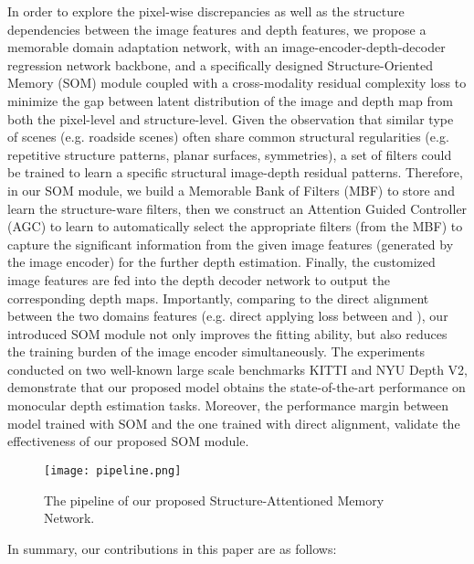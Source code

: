 \documentclass[letterpaper]{article} \usepackage{aaai20}  \usepackage{times}  \usepackage{helvet} \usepackage{courier}  \usepackage{graphicx} \frenchspacing  \setlength{\pdfpagewidth}{8.5in}  \setlength{\pdfpageheight}{11in}  \usepackage{epsfig}
\begin{document}
        \indent In order to explore the pixel-wise discrepancies as well as the structure dependencies between the image features and depth features, we propose a memorable domain adaptation network, with an image-encoder-depth-decoder regression network backbone, and a specifically designed Structure-Oriented Memory (SOM) module coupled with a cross-modality residual complexity loss to minimize the gap between latent distribution of the image and depth map from both the pixel-level and structure-level. Given the observation that similar type of scenes (e.g. roadside scenes) often share common structural regularities (e.g. repetitive structure patterns, planar surfaces, symmetries), a set of filters could be trained to learn a specific structural image-depth residual patterns. Therefore, in our SOM module, we build a Memorable Bank of Filters (MBF) to store and learn the structure-ware filters, then we construct an Attention Guided Controller (AGC) to learn to automatically select the appropriate filters (from the MBF) to capture the significant information from the given image features (generated by the image encoder) for the further depth estimation. Finally, the customized image features are fed into the depth decoder network to output the corresponding depth maps. Importantly, comparing to the direct alignment between the two domains features (e.g. direct applying  loss between  and ), our introduced SOM module not only improves the fitting ability, but also reduces the training burden of the image encoder simultaneously. The experiments conducted on two well-known large scale benchmarks KITTI and NYU Depth V2, demonstrate that our proposed model obtains the state-of-the-art performance on monocular depth estimation tasks. Moreover, the performance margin between model trained with SOM and the one trained with direct alignment, validate the effectiveness of our proposed SOM module.
        \begin{figure*}
    \begin{center}
    \texttt{[image: pipeline.png]}
    \end{center}
    \vspace{-15pt}
       \caption{The pipeline of our proposed Structure-Attentioned Memory Network. }
    \label{fig:pipeline}
    \vspace{-10pt}
    \end{figure*}
    In summary, our contributions in this paper are as follows:
\end{document}

